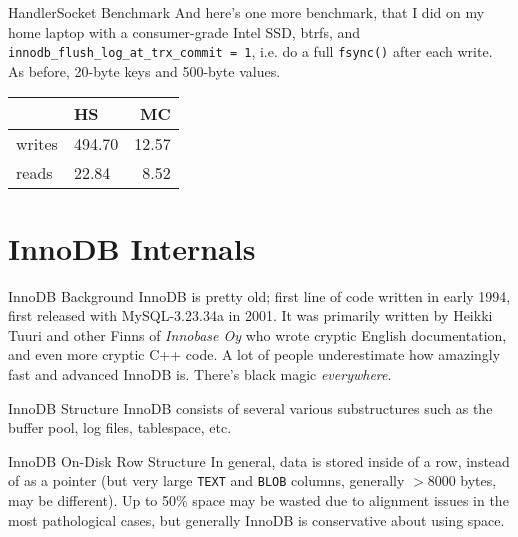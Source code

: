 \documentclass[14pt]{beamer}
\begin{document}
\begin{frame}{HandlerSocket Benchmark}
  And here's one more benchmark, that I did on my home laptop with a
  consumer-grade Intel SSD, btrfs, and
  \texttt{innodb\_flush\_log\_at\_trx\_commit = 1}, i.e. do a full
  \texttt{fsync()} after each write. As before, 20-byte keys and 500-byte
  values.

  \begin{table}[ht]
  \begin{tabular}{l l r}
           & HS & MC \\ \hline
    writes & 494.70        & 12.57     \\
    reads  & 22.84         & 8.52      \\
  \end{tabular}
  \end{table}
\end{frame}

\section{InnoDB Internals}

\begin{frame}{InnoDB Background}
  InnoDB is pretty old; first line of code written in early 1994, first released
  with MySQL-3.23.34a in 2001.
  \newline
  \newline
  It was primarily written by Heikki Tuuri and other Finns of \emph{Innobase Oy}
  who wrote cryptic English documentation, and even more cryptic C++ code.
  \newline
  \newline
  A lot of people underestimate how amazingly fast and advanced InnoDB
  is. There's black magic \emph{everywhere}.
\end{frame}

\begin{frame}{InnoDB Structure}
  InnoDB consists of several various substructures such as the buffer pool, log
  files, tablespace, etc.
\end{frame}

\begin{frame}{InnoDB On-Disk Row Structure}
  In general, data is stored inside of a row, instead of as a pointer (but very
  large \texttt{TEXT} and \texttt{BLOB} columns, generally $>8000$ bytes, may be
  different).
  \newline
  \newline
  Up to 50\% space may be wasted due to alignment issues in the most
  pathological cases, but generally InnoDB is conservative about using space.
\end{frame}
\end{document}
